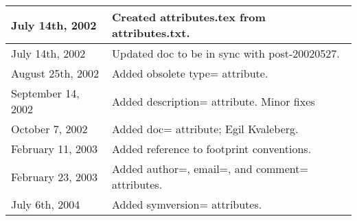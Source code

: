 \documentclass{article}
\begin{document}
\begin{table}[h]
\begin{tabular}{|l|l|} \hline
July 14th, 2002 & Created attributes.tex from attributes.txt. \\ \hline
July 14th, 2002 & Updated doc to be in sync with post-20020527. \\ \hline
August 25th, 2002 & Added obsolete type= attribute. \\ \hline
September 14, 2002 & Added description= attribute. Minor fixes\\ \hline
October 7, 2002 & Added doc= attribute; Egil Kvaleberg.\\ \hline
February 11, 2003 & Added reference to footprint conventions.\\ \hline
February 23, 2003 & Added author=, email=, and comment= attributes.\\ \hline
July 6th, 2004 & Added symversion= attributes.\\ \hline

\end{tabular}
\end{table}
\end{document}
